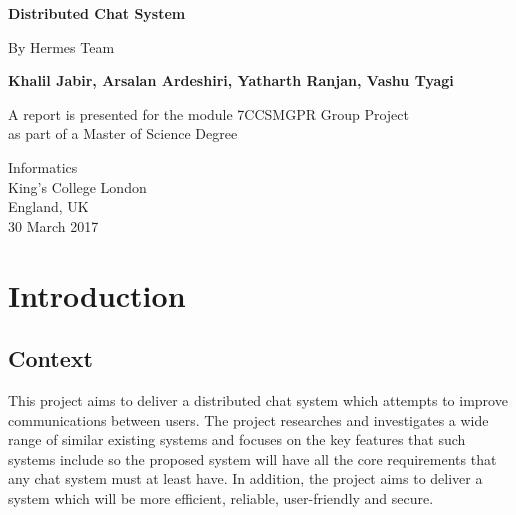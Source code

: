 \documentclass{article}
\begin{document}
\graphicspath{ {images/} }

 \begin{center}
        
        \Huge
        \textbf{Distributed Chat System}
        
        \vspace{0.5cm}
        
        \Large
        By Hermes Team
        
        \vspace{1.5cm}

        \textbf{Khalil Jabir, Arsalan Ardeshiri, Yatharth Ranjan, Vashu Tyagi}
        
         \vspace{1.5cm}
         
        A report is presented for the module 7CCSMGPR Group Project\\
        as part of a Master of Science Degree
        
         \vspace{1.5cm}
        
        \Large
        Informatics\\
        King's College London\\
        England, UK\\
        30 March 2017\\
        
 \end{center}

\newpage
\begin{center}
\tableofcontents

\end{center}

\newpage
\section{Introduction}
\subsection{Context}
This project aims to deliver a distributed chat system which attempts to improve communications between users. The project researches and investigates a wide range of similar existing systems and focuses on the key features that such systems include so the proposed system will have all the core requirements that any chat system must at least have. In addition, the project aims to deliver a system which will be more efficient, reliable, user-friendly and secure.  \par
\end{document}
